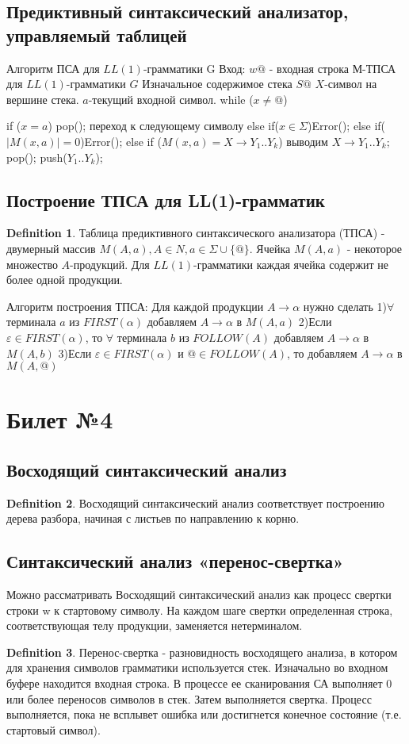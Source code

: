 \documentclass[a4paper]{article}
\theoremstyle{plain}
\theoremstyle{remark}
\theoremstyle{definition}
\newtheorem*{definition-star}{Definition}
\begin{document}
\subsection{Предиктивный синтаксический анализатор, управляемый таблицей}
Алгоритм ПСА для $LL(1)$-грамматики G
Вход: $w@$ - входная строка
М-ТПСА для $LL(1)$-грамматики $G$
Изначальное содержимое стека $S@$
$X$-символ на вершине стека.
$a$-текущий входной символ.
while ($x\ne @$){
    if ($x=a$){
        pop();
        переход к следующему символу
        }
        else if($x \in\Sigma$){Error();}
        else if($|M(x,a)|=0$){Error();}
        else if ($M(x,a)=X\rightarrow Y_1..Y_k$){
        выводим $X\rightarrow Y_1..Y_k$;
        pop();
        push($Y_1..Y_k$);
        }
\subsection{Построение ТПСА для LL(1)-грамматик}
\begin{definition-star}
Таблица предиктивного синтаксического анализатора (ТПСА) - двумерный массив $M(A,a),A\in N, a \in \Sigma\cup\{@\}$.
Ячейка $M(A,a)$ - некоторое множество $A$-продукций.
Для $LL(1)$-грамматики каждая ячейка содержит не более одной продукции.
\end{definition-star}
Алгоритм построения ТПСА:
Для каждой продукции $A\rightarrow\alpha$ нужно сделать
1)$\forall$ терминала $a$ из $FIRST(\alpha)$ добавляем $A\rightarrow\alpha$ в $M(A,a)$
2)Если $\varepsilon \in FIRST(\alpha)$, то $\forall$ терминала $b$ из $FOLLOW(A)$ добавляем $A\rightarrow\alpha$ в $M(A,b)$
3)Если $\varepsilon \in FIRST(\alpha)$ и $@ \in FOLLOW(A)$, то добавляем $A\rightarrow\alpha$ в $M(A,@)$
\section{Билет №4}
\subsection{Восходящий синтаксический анализ}
\begin{definition-star}
Восходящий синтаксический анализ соответствует построению дерева разбора, начиная с листьев по направлению к корню.
\end{definition-star}
\subsection{Синтаксический анализ «перенос-свертка»}
Можно рассматривать Восходящий синтаксический анализ как процесс свертки строки w к стартовому символу. На каждом шаге свертки определенная строка, соответствующая телу продукции, заменяется нетерминалом.
\begin{definition-star}
Перенос-свертка - разновидность восходящего анализа, в котором для хранения символов грамматики используется стек.
Изначально во входном буфере находится входная строка.
В процессе ее сканирования СА выполняет 0 или более переносов символов в стек. Затем выполняется свертка. Процесс выполняется, пока не всплывет ошибка или достигнется конечное состояние (т.е. стартовый символ).
\end{definition-star}
}
\end{document}
